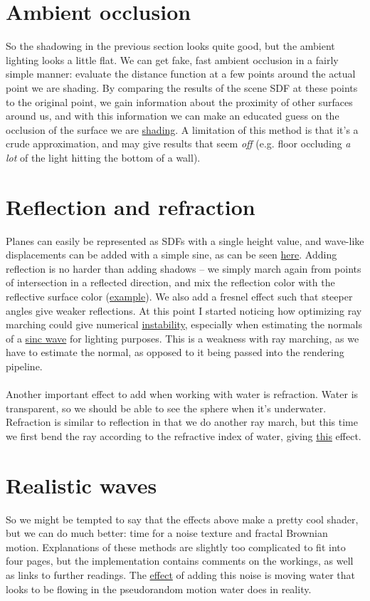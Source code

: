 \documentclass[abstract=off,oneside]{scrreprt}
\begin{document}
\section*{Ambient occlusion}
\label{sec-7}
\label{sec:ao}
So the shadowing in the previous section looks quite good, but the
ambient lighting looks a little flat. We can get fake, fast ambient
occlusion in a fairly simple manner: evaluate the distance function at
a few points around the actual point we are shading. By comparing the
results of the scene SDF at these points to the original point, we
gain information about the proximity of other surfaces around us, and
with this information we can make an educated guess on the occlusion
of the surface we are \hyperref[fig:ao]{shading}. A limitation of this method is that
it's a crude approximation, and may give results that seem \emph{off}
(e.g. floor occluding \emph{a lot} of the light hitting the bottom of a
wall).

\section*{Reflection and refraction}
\label{sec-8}
\label{sec:water}
Planes can easily be represented as SDFs with a single height value,
and wave-like displacements can be added with a simple sine, as can be
seen \hyperref[fig:simplewater]{here}. Adding reflection is no harder than adding shadows -- we
simply march again from points of intersection in a reflected
direction, and mix the reflection color with the reflective surface
color (\hyperref[fig:reflection]{example}). We also add a fresnel effect such that steeper angles
give weaker reflections. At this point I started noticing how
optimizing ray marching could give numerical \hyperref[fig:instability]{instability}, especially
when estimating the normals of a \hyperref[fig:instability2]{sinc wave} for lighting purposes. This
is a weakness with ray marching, as we have to estimate the normal, as
opposed to it being passed into the rendering pipeline.
\\\\
Another important effect to add when working with water is
refraction. Water is transparent, so we should be able to see the
sphere when it's underwater. Refraction is similar to reflection in
that we do another ray march, but this time we first bend the ray
according to the refractive index of water, giving \hyperref[fig:refraction]{this} effect.

\section*{Realistic waves}
\label{sec-9}
\label{sec:realisticwaves}
So we might be tempted to say that the effects above make a pretty
cool shader, but we can do much better: time for a noise texture and
fractal Brownian motion. Explanations of these methods are slightly
too complicated to fit into four pages, but the implementation
contains comments on the workings, as well as links to further
readings. The \hyperref[fig:noise]{effect} of adding this noise is moving water that
looks to be flowing in the pseudorandom motion water does in reality.
\end{document}
